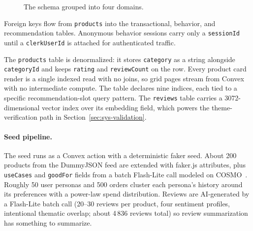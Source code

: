 \begin{figure}[ht]
{%
  }
  \caption{The schema grouped into four domains.}
  \label{fig:er-diagram}
\end{figure}

Foreign keys flow from \texttt{products} into the
transactional, behavior, and recommendation tables. Anonymous
behavior sessions carry only a \texttt{sessionId} until a
\texttt{clerkUserId} is attached for authenticated traffic.

The \texttt{products} table is denormalized: it stores
\texttt{category} as a string alongside \texttt{categoryId} and
keeps \texttt{rating} and \texttt{reviewCount} on the row. Every
product card render is a single indexed read with no joins, so
grid pages stream from Convex with no intermediate compute. The
table declares nine indices, each tied to a specific
recommendation-slot query pattern. The \texttt{reviews} table
carries a 3072-dimensional vector index over its embedding field,
which powers the theme-verification path in
Section~\ref{sec:sys-validation}.

\paragraph{Seed pipeline.} The seed runs as a Convex action with
a deterministic faker seed. About 200 products from the
DummyJSON feed are extended with faker.js attributes, plus
\texttt{useCases} and \texttt{goodFor} fields from a batch
Flash-Lite call modeled on COSMO~\cite{COSMO}. Roughly 50
user personas and 500 orders cluster each persona's history
around its preferences with a power-law spend distribution.
Reviews are AI-generated by a Flash-Lite batch call (20--30
  reviews per product, four sentiment profiles, intentional
thematic overlap; about 4\,836 reviews total) so review
summarization has something to summarize.

